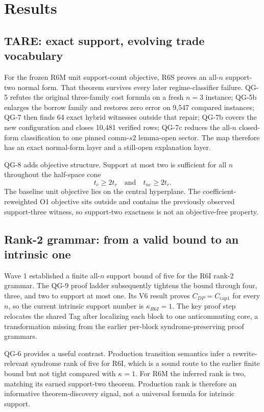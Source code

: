 \section{Results}

\subsection{TARE: exact support, evolving trade vocabulary}
For the frozen R6M unit support-count objective, R6S proves an all-$n$ support-two normal form. That theorem survives every later regime-classifier failure. QG-5 refutes the original three-family cost formula on a fresh $n=3$ instance; QG-5b enlarges the borrow family and restores zero error on 9,547 compared instances; QG-7 then finds 64 exact hybrid witnesses outside that repair; QG-7b covers the new configuration and closes 10,481 verified rows; QG-7c reduces the all-$n$ closed-form classification to one pinned comm-$s2$ lemma-open sector. The map therefore has an exact normal-form layer and a still-open explanation layer.

QG-8 adds objective structure. Support at most two is sufficient for all $n$ throughout the half-space cone
\[
t_c\ge 2t_r\quad\text{and}\quad t_{nc}\ge 2t_r.
\]
The baseline unit objective lies on the central hyperplane. The coefficient-reweighted O1 objective sits outside and contains the previously observed support-three witness, so support-two exactness is not an objective-free property.

\subsection{Rank-2 grammar: from a valid bound to an intrinsic one}
Wave 1 established a finite all-$n$ support bound of five for the R6I rank-2 grammar. The QG-9 proof ladder subsequently tightens the bound through four, three, and two to support at most one. Its V6 result proves $C_{DP}=C_{\mathrm{cap1}}$ for every $n$, so the current intrinsic support number is $\kappa_{R6I}=1$. The key proof step relocates the shared Tag after localizing each block to one anticommuting core, a transformation missing from the earlier per-block syndrome-preserving proof grammars.

QG-6 provides a useful contrast. Production transition semantics infer a rewrite-relevant syndrome rank of five for R6I, which is a sound route to the earlier finite bound but not tight compared with $\kappa=1$. For R6M the inferred rank is two, matching its earned support-two theorem. Production rank is therefore an informative theorem-discovery signal, not a universal formula for intrinsic support.

